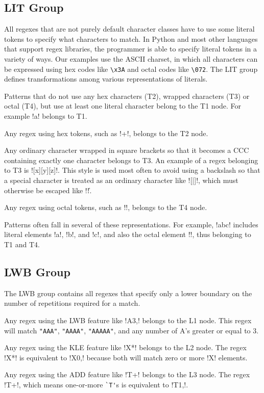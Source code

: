 \subsection{LIT Group}
All regexes that are not purely default character classes have to use some literal tokens to specify what characters to match.  In Python and most other languages that support regex libraries, the programmer is able to specify literal tokens in a variety of ways.  Our examples use the ASCII charset, in which all characters can be expressed using hex codes like \verb!\x3A! and octal codes like \verb!\072!.  The LIT group defines transformations among various representations of literals.

\begin{description}  \itemsep -1pt
\item[T1:] Patterns that do not use any hex characters (T2), wrapped characters (T3) or octal (T4), but use at least one literal character belong to the T1 node.  For example \cverb!a! belongs to T1.
\item[T2:] Any regex using hex tokens, such as \cverb!+!, belongs to the T2 node.
\item[T3:]  Any ordinary character wrapped in square brackets so that it becomes a CCC containing exactly one character belongs to T3.
An example of a regex belonging to T3 is \cverb![x][y][z]!. This style is used most often to avoid using a backslash so that a special character is treated as an ordinary character like \cverb![|]!, which must otherwise be escaped like \cverb!\|!.
\item[T4:] Any regex using octal tokens, such as \cverb!!, belongs to the T4 node.
\end{description}

Patterns often fall in several of these representations.  For example, \cverb!abc! includes literal elements \cverb!a!, \cverb!b!, and \cverb!c!, and also the octal element \cverb!!, thus belonging to T1 and T4.

\subsection{LWB Group}
The LWB group contains all regexes that specify only a lower boundary on the number of repetitions required for a match.

\begin{description}  \itemsep -1pt
\item[L1:] Any regex using the LWB feature like \cverb!A{3,}! belongs to the L1 node.  This regex will match \verb!"AAA"!, \verb!"AAAA"!, \verb!"AAAAA"!, and any number of A's greater or equal to 3.
\item[L2:] Any regex using the KLE feature like \cverb!X*! belongs to the L2 node. The regex \cverb!X*! is equivalent to \cverb!X{0,}! because both will match zero or more \cverb!X! elements.
\item[L3:] Any regex using the ADD feature like \cverb!T+! belongs to the L3 node. The regex \cverb!T+!, which means one-or-more \verb!`T'!s is equivalent to \cverb!T{1,}!.
\end{description}

